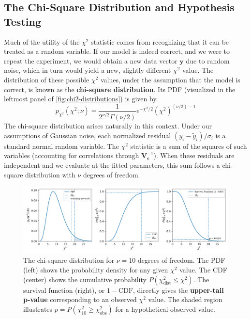 \subsection{The Chi-Square Distribution and Hypothesis Testing}
Much of the utility of the $\chi^2$ statistic comes from recognizing that it can be treated as a random variable. If our model is indeed correct, and we were to repeat the experiment, we would obtain a new data vector $\mathbf{y}$ due to random noise, which in turn would yield a new, slightly different $\chi^2$ value. The distribution of these possible $\chi^2$ values, under the assumption that the model is correct, is known as the \textbf{chi-square distribution}. Its PDF (visualized in the leftmost panel of \autoref{fig:chi2-distributions}) is given by
\begin{equation}
    p_{\chi^2}(\chi^2; \nu) = \frac{1}{2^{\nu/2}\Gamma(\nu/2)} e^{-\chi^2/2} (\chi^2)^{(\nu/2)-1}
\end{equation}
The chi-square distribution arises naturally in this context. Under our assumptions of Gaussian noise, each normalized residual $(y_i - \tilde{y}_i)/\sigma_i$ is a standard normal random variable. The $\chi^2$ statistic is a sum of the squares of such variables (accounting for correlations through $\mathbf{V}_{\boldsymbol{\epsilon}}^{-1}$). When these residuals are independent and we evaluate at the fitted parameters, this sum follows a chi-square distribution with $\nu$ degrees of freedom.
\begin{figure}[h!]
    \centering
    \includegraphics[width=\textwidth]{figs/models-vs-data/chi_square.pdf}
    \caption{The chi-square distribution for $\nu=10$ degrees of freedom. The PDF (left) shows the probability density for any given $\chi^2$ value. The CDF (center) shows the cumulative probability $P(\chi^2_{\text{dist}} \le \chi^2)$. The survival function (right), or $1-\text{CDF}$, directly gives the \textbf{upper-tail p-value} corresponding to an observed $\chi^2$ value. The shaded region illustrates $p = P(\chi^2_{10} \ge \chi^2_{\text{obs}})$ for a hypothetical observed value.}
    \label{fig:chi2-distributions}
\end{figure}
